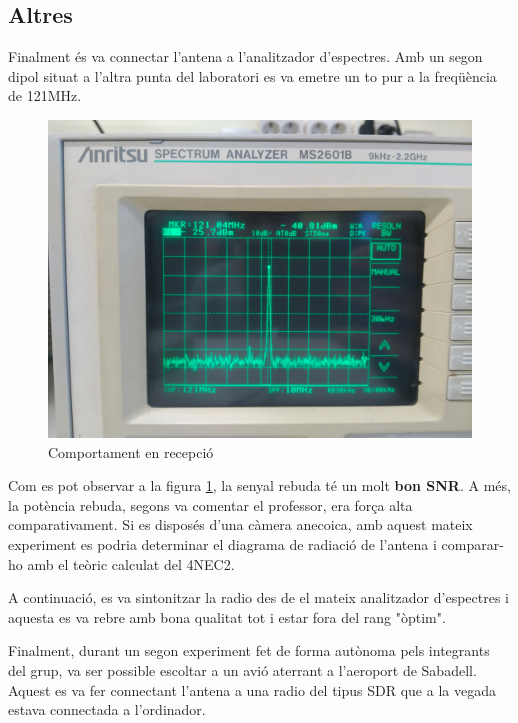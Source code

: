 \subsection{Altres}
Finalment és va connectar l'antena a l'analitzador d'espectres. Amb un segon dipol situat a l'altra punta del laboratori es va emetre un to pur a la freqüència de 121MHz.
\begin{figure}[H]
	\centering
	\includegraphics[width=\textwidth]{./images/Mesures/5recepcio.jpg}
	\caption{Comportament en recepció}
	\label{RX}
\end{figure}
Com es pot observar a la figura \ref{RX}, la senyal rebuda té un molt \textbf{bon SNR}. A més, la potència rebuda, segons va comentar el professor, era força alta comparativament. Si es disposés d'una càmera anecoica, amb aquest mateix experiment es podria determinar el diagrama de radiació de l'antena i comparar-ho amb el teòric calculat del 4NEC2.

A continuació, es va sintonitzar la radio des de el mateix analitzador d'espectres i aquesta es va rebre amb bona qualitat tot i estar fora del rang "òptim". 

Finalment, durant un segon experiment fet de forma autònoma pels integrants del grup, va ser possible escoltar a un avió aterrant a l'aeroport de Sabadell. Aquest es va fer connectant l'antena a una radio del tipus SDR que a la vegada estava connectada a l'ordinador.